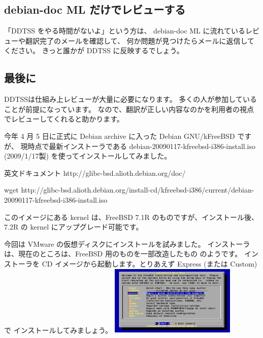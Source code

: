 \documentclass[mingoth,a4paper]{jsarticle}
\begin{document}
\subsection{debian-doc ML だけでレビューする}

「DDTSS をやる時間がないよ」という方は、
debian-doc ML に流れているレビューや翻訳完了のメールを確認して、
何か問題が見つけたらメールに返信してください。
きっと誰かが DDTSS に反映するでしょう。

\subsection{最後に}

DDTSSは仕組み上レビューが大量に必要になります。
多くの人が参加していることが前提になっています。
なので、翻訳が正しい内容なのかを利用者の視点でレビューしてくれると助かります。


今年 4 月 5 日に正式に Debian archive に入った Debian GNU/kFreeBSD ですが、
現時点で最新インストーラである debian-20090117-kfreebsd-i386-install.iso 
(2009/1/17製) を使ってインストールしてみました。

英文ドキュメント
http://glibc-bsd.alioth.debian.org/doc/

\begin{commandline}
wget http://glibc-bsd.alioth.debian.org/install-cd/kfreebsd-i386/current/debian-20090117-kfreebsd-i386-install.iso
\end{commandline}

このイメージにある kernel は、FreeBSD 7.1R のものですが、インストール後、
7.2R の kernel にアップグレード可能です。

今回は VMware の仮想ディスクにインストールを試みました。
インストーラは、現在のところは、FreeBSD 用のものを一部改造したもの
のようです。
インストーラを CD イメージから起動します。とりあえず Express (または Custom)で
インストールしてみましょう。
\includegraphics[width=6cm]{image200906/kfreebsd02.png}
\end{document}
